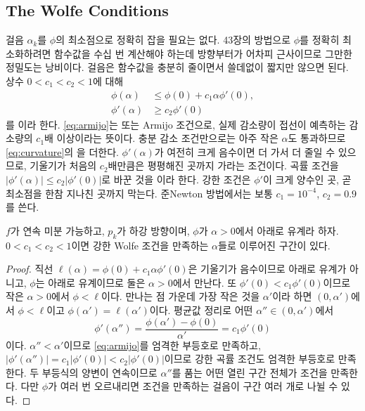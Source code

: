 \subsection{The Wolfe Conditions}

걸음 $\alpha_k$를 $\phi$의 최소점으로 정확히 잡을 필요는 없다. 43장의 방법으로 $\phi$를 정확히 최소화하려면 함수값을 수십 번 계산해야 하는데 방향부터가 어차피 근사이므로 그만한 정밀도는 낭비이다. 걸음은 함수값을 충분히 줄이면서 쓸데없이 짧지만 않으면 된다. 상수 $0<c_1<c_2<1$에 대해
\begin{align}
\phi(\alpha)&\le\phi(0)+c_1\alpha\phi'(0),\label{eq:armijo}\\
\phi'(\alpha)&\ge c_2\phi'(0)\label{eq:curvature}
\end{align}
를 이라 한다\cite{wolfe1969,wolfe1971}. \eqref{eq:armijo}는  또는 Armijo 조건으로\cite{armijo1966}, 실제 감소량이 접선이 예측하는 감소량의 $c_1$배 이상이라는 뜻이다. 충분 감소 조건만으로는 아주 작은 $\alpha$도 통과하므로 \eqref{eq:curvature}의 을 더한다. $\phi'(\alpha)$가 여전히 크게 음수이면 더 가서 더 줄일 수 있으므로, 기울기가 처음의 $c_2$배만큼은 평평해진 곳까지 가라는 조건이다. 곡률 조건을 $|\phi'(\alpha)|\le c_2|\phi'(0)|$로 바꾼 것을 이라 한다. 강한 조건은 $\phi'$이 크게 양수인 곳, 곧 최소점을 한참 지나친 곳까지 막는다. 준Newton 방법에서는 보통 $c_1=10^{-4}$, $c_2=0.9$를 쓴다.

\begin{proposition}
\label{prop:wolfe-exists}
$f$가 연속 미분 가능하고, $p_k$가 하강 방향이며, $\phi$가 $\alpha>0$에서 아래로 유계라 하자. $0<c_1<c_2<1$이면 강한 Wolfe 조건을 만족하는 $\alpha$들로 이루어진 구간이 있다.
\end{proposition}

\begin{proof}
직선 $\ell(\alpha)=\phi(0)+c_1\alpha\phi'(0)$은 기울기가 음수이므로 아래로 유계가 아니고, $\phi$는 아래로 유계이므로 둘은 $\alpha>0$에서 만난다. 또 $\phi'(0)<c_1\phi'(0)$이므로 작은 $\alpha>0$에서 $\phi<\ell$이다. 만나는 점 가운데 가장 작은 것을 $\alpha'$이라 하면 $(0,\alpha')$에서 $\phi<\ell$이고 $\phi(\alpha')=\ell(\alpha')$이다. 평균값 정리로 어떤 $\alpha''\in(0,\alpha')$에서
\[
\phi'(\alpha'')=\frac{\phi(\alpha')-\phi(0)}{\alpha'}=c_1\phi'(0)
\]
이다. $\alpha''<\alpha'$이므로 \eqref{eq:armijo}를 엄격한 부등호로 만족하고, $|\phi'(\alpha'')|=c_1|\phi'(0)|<c_2|\phi'(0)|$이므로 강한 곡률 조건도 엄격한 부등호로 만족한다. 두 부등식의 양변이 연속이므로 $\alpha''$를 품는 어떤 열린 구간 전체가 조건을 만족한다. 다만 $\phi$가 여러 번 오르내리면 조건을 만족하는 걸음이 구간 여러 개로 나뉠 수 있다.
\end{proof}

